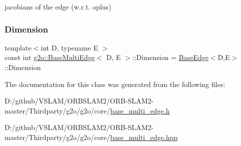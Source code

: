 jacobians of the edge (w.\+r.\+t. oplus) 

\mbox{\label{classg2o_1_1_base_multi_edge_a3c713fe8d1cd161f777625d8e2d5695d}} 
\subsubsection{\texorpdfstring{Dimension}{Dimension}}
{\footnotesize\ttfamily template$<$int D, typename E $>$ \\
const int \mbox{\hyperlink{classg2o_1_1_base_multi_edge}{g2o\+::\+Base\+Multi\+Edge}}$<$ D, E $>$\+::Dimension = \mbox{\hyperlink{classg2o_1_1_base_edge}{Base\+Edge}}$<$D,E$>$\+::Dimension\hspace{0.3cm}{\ttfamily [static]}}



The documentation for this class was generated from the following files\+:\begin{DoxyCompactItemize}
\item 
D\+:/github/\+V\+S\+L\+A\+M/\+O\+R\+B\+S\+L\+A\+M2/\+O\+R\+B-\/\+S\+L\+A\+M2-\/master/\+Thirdparty/g2o/g2o/core/\mbox{\hyperlink{base__multi__edge_8h}{base\+\_\+multi\+\_\+edge.\+h}}\item 
D\+:/github/\+V\+S\+L\+A\+M/\+O\+R\+B\+S\+L\+A\+M2/\+O\+R\+B-\/\+S\+L\+A\+M2-\/master/\+Thirdparty/g2o/g2o/core/\mbox{\hyperlink{base__multi__edge_8hpp}{base\+\_\+multi\+\_\+edge.\+hpp}}\end{DoxyCompactItemize}
